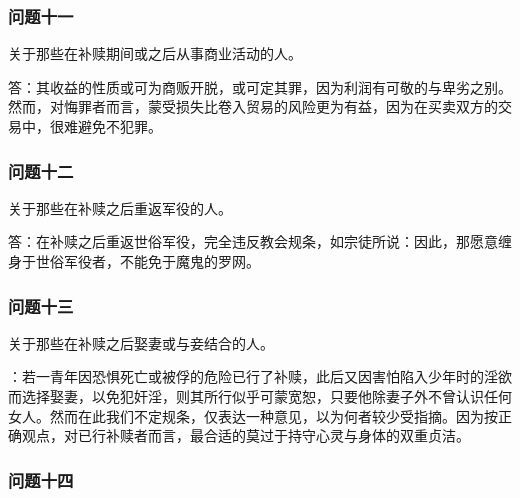 
\subsubsection{问题十一}

关于那些在补赎期间或之后从事商业活动的人。\par

答：其收益的性质或可为商贩开脱，或可定其罪，因为利润有可敬的与卑劣之别。然而，对悔罪者而言，蒙受损失比卷入贸易的风险更为有益，因为在买卖双方的交易中，很难避免不犯罪。\par


\subsubsection{问题十二}

关于那些在补赎之后重返军役的人。\par

答：在补赎之后重返世俗军役，完全违反教会规条，如宗徒所说：因此，那愿意缠身于世俗军役者，不能免于魔鬼的罗网。\par


\subsubsection{问题十三}

关于那些在补赎之后娶妻或与妾结合的人。\par

：若一青年因恐惧死亡或被俘的危险已行了补赎，此后又因害怕陷入少年时的淫欲而选择娶妻，以免犯奸淫，则其所行似乎可蒙宽恕，只要他除妻子外不曾认识任何女人。然而在此我们不定规条，仅表达一种意见，以为何者较少受指摘。因为按正确观点，对已行补赎者而言，最合适的莫过于持守心灵与身体的双重贞洁。\par


\subsubsection{问题十四}

